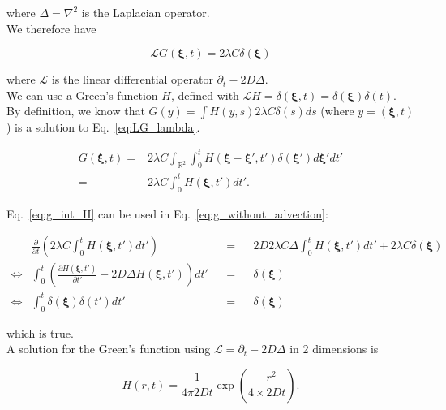 where $\Delta=\nabla^{2}$ is the Laplacian operator. \\

We therefore have 

\begin{equation}
\mathcal{L}G(\boldsymbol{\xi},t)=2\lambda C\delta(\boldsymbol{\xi})\label{eq:LG_lambda}
\end{equation}

where $\mathcal{L}$ is the linear differential operator $\partial_{t}-2D\Delta$. \\

We can use a Green's function $H$, defined with $\mathcal{L}H=\delta(\boldsymbol{\xi},t)=\delta(\boldsymbol{\xi})\delta(t)$. \\

By definition, we know that $G(y)=\int H(y,s)2\lambda C\delta(s)ds$
(where $y=(\boldsymbol{\xi},t)$) is a solution to Eq.~\ref{eq:LG_lambda}.

\begin{align}
 G(\boldsymbol{\xi},t)  =  & 2\lambda C\int_{\mathbb{R}^{2}}\int_{0}^{t}H(\boldsymbol{\xi}-\boldsymbol{\xi}',t')\delta(\boldsymbol{\xi}')d\boldsymbol{\xi}'dt'\nonumber \\
 = &  2\lambda C\int_{0}^{t}H(\boldsymbol{\xi},t')dt'.\label{eq:g_int_H}
\end{align}

Eq.~\ref{eq:g_int_H} can be used in Eq.~\ref{eq:g_without_advection}:

\begin{align}
 & \frac{\partial}{\partial t}\left(2\lambda C\int_{0}^{t}H(\boldsymbol{\xi},t')dt'\right) & & = & & 2D2\lambda C\Delta\int_{0}^{t}H(\boldsymbol{\xi},t')dt'+2\lambda C\delta(\boldsymbol{\xi})\\
\Leftrightarrow & \int_{0}^{t}\left(\frac{\partial H(\boldsymbol{\xi},t')}{\partial t'}-2D\Delta H(\boldsymbol{\xi},t')\right)dt' & & = & & \delta(\boldsymbol{\xi})\\
\Leftrightarrow & \int_{0}^{t}\delta(\boldsymbol{\xi})\delta(t')dt' & & = & & \delta(\boldsymbol{\xi})
\end{align}

which is true. \\

A solution for the Green's function using $\mathcal{L}=\partial_{t}-2D\Delta$
in 2 dimensions is 

\begin{equation}
H(r,t)=\frac{1}{4\pi2Dt}\exp\left(\frac{-r^{2}}{4\times2Dt}\right). 
\end{equation}

